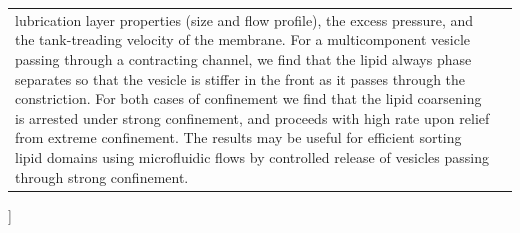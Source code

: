 \documentclass[twoside,twocolumn,9pt]{article}
\begin{document}
\begin{@twocolumnfalse}
\begin{tabular}{m{4.5cm} p{13.5cm} }
{  lubrication layer properties (size and flow profile), the excess
  pressure, and the tank-treading velocity of the membrane. For a
  multicomponent vesicle passing through a contracting channel, we find
  that the lipid always phase separates so that the vesicle is stiffer
  in the front as it passes through the constriction. For both cases of
  confinement we find that the lipid coarsening is arrested under strong
  confinement, and proceeds with high rate upon relief from extreme
  confinement. The results may be useful for efficient sorting lipid
  domains using microfluidic flows by controlled release of vesicles
  passing through strong confinement. } \\
%
\end{tabular}
%
 \end{@twocolumnfalse} \vspace{0.6cm}
]

\renewcommand*\rmdefault{bch}\normalfont\upshape
\rmfamily
\section*{}
\vspace{-1cm}





\end{document}
